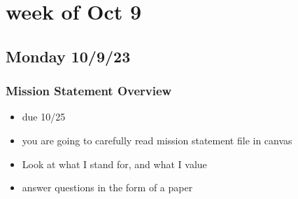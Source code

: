 \documentclass[12pt]{article}
\begin{document}
    \tableofcontents \newpage
    \section{week of Oct 9}
    \subsection{Monday 10/9/23}
        \subsubsection{Mission Statement Overview}
            \begin{itemize}
                \item due 10/25
                \item you are going to carefully read mission statement file in canvas
                \item Look at what I stand for, and what I value
                \item answer questions in the form of a paper
            \end{itemize}


\end{document}
